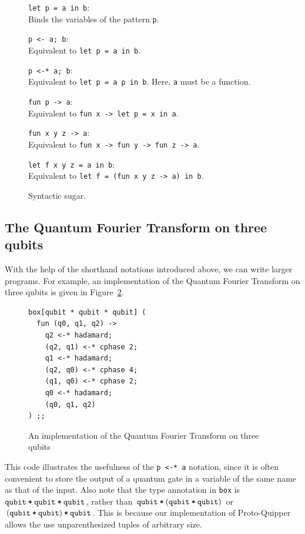 \begin{figure}[!ht]
\begin{compactitemize}
\item \verb#let p = a in b#:\\ Binds the variables of the pattern 
  \verb#p#.
\item \verb#p <- a; b#:\\ Equivalent to \verb#let p = a in b#.
\item \verb#p <-* a; b#: \\ Equivalent to \verb#let p = a p in b#.
  Here, \verb#a# must be a function.
\item  \verb#fun p -> a#: \\ Equivalent to
                                \verb#fun x -> let p = x in a#.
\item  \verb#fun x y z -> a#: \\ Equivalent to
                                \verb#fun x -> fun y -> fun z -> a#.
\item  \verb#let f x y z = a in b#: \\ Equivalent to
  \verb#let f = (fun x y z -> a) in b#.
\end{compactitemize}
\caption{Syntactic sugar.}
\label{sugar}
\end{figure}

\subsection{The Quantum Fourier Transform on three qubits}

With the help of the shorthand notations introduced above, we can write 
larger programs. For example, an implementation of the Quantum Fourier 
Transform on three qubits is given in Figure~\ref{fig-qft3}.
\begin{figure}[!ht]
\begin{splitcode}
\begin{verbatim}
box[qubit * qubit * qubit] (
  fun (q0, q1, q2) ->
    q2 <-* hadamard;
    (q2, q1) <-* cphase 2;
    q1 <-* hadamard;
    (q2, q0) <-* cphase 4;
    (q1, q0) <-* cphase 2;
    q0 <-* hadamard;
    (q0, q1, q2)
) ;;
\end{verbatim}
  \split {}
\end{splitcode}
\caption{An implementation of the Quantum Fourier
Transform on three qubits}
\label{fig-qft3}
\end{figure}
This code illustrates the usefulness of the \verb#p <-* a# notation,
since it is often convenient to store the output of a quantum gate in
a variable of the same name as that of the input. Also note that the
type annotation in \verb#box# is $\texttt{qubit}\mathbin{\texttt{*}}\texttt{qubit}\mathbin{\texttt{*}}\texttt{qubit}$, rather
than $\texttt{qubit}\mathbin{\texttt{*}}(\texttt{qubit}\mathbin{\texttt{*}}\texttt{qubit})$ or $(\texttt{qubit}\mathbin{\texttt{*}}\texttt{qubit})\mathbin{\texttt{*}}\texttt{qubit}$.
This is because our implementation of Proto-Quipper allows the use
unparenthesized tuples of arbitrary size.

